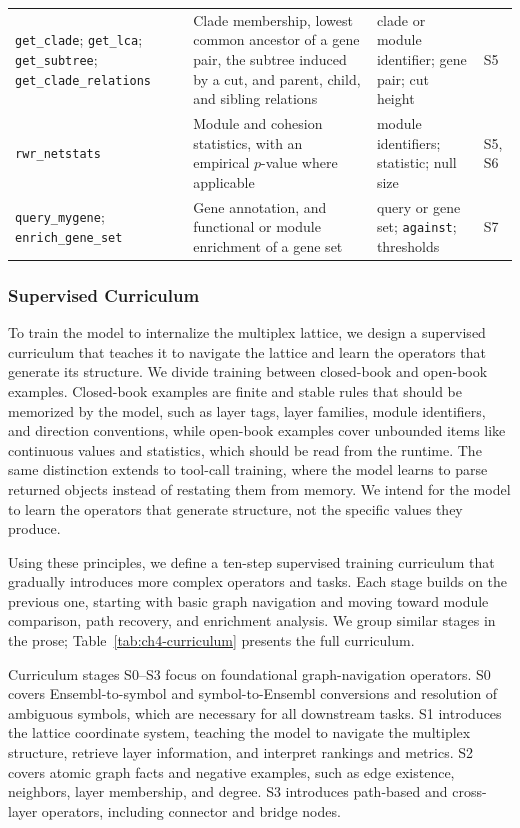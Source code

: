 \documentclass[thesis,letterpaper,12pt]{utthesis}
\begin{document}
\begin{table}[htb!]
\begin{tabularx}{\textwidth}{@{}>{\raggedright\arraybackslash}p{} Y >{\raggedright\arraybackslash}p{0.175\textwidth} >{\centering\arraybackslash}p{0.055\textwidth}@{}}
\addlinespace
\texttt{get\_clade}; \texttt{get\_lca}; \texttt{get\_subtree}; \texttt{get\_clade\_relations}
  & Clade membership, lowest common ancestor of a gene pair, the subtree induced by a cut, and parent, child, and sibling relations
  & clade or module identifier; gene pair; cut height & S5 \\
\addlinespace
\texttt{rwr\_netstats}
  & Module and cohesion statistics, with an empirical $p$-value where applicable
  & module identifiers; statistic; null size & S5, S6 \\
\addlinespace
\texttt{query\_mygene}; \texttt{enrich\_gene\_set}
  & Gene annotation, and functional or module enrichment of a gene set
  & query or gene set; \texttt{against}; thresholds & S7 \\
\bottomrule
\end{tabularx}
\end{table}

\subsubsection{Supervised Curriculum}\label{sec:ch4-curriculum}
To train the model to internalize the multiplex lattice, we design a supervised curriculum that teaches it to navigate the lattice and learn the operators that generate its structure. We divide training between closed-book and open-book examples. Closed-book examples are finite and stable rules that should be memorized by the model, such as layer tags, layer families, module identifiers, and direction conventions, while open-book examples cover unbounded items like continuous values and statistics, which should be read from the runtime. The same distinction extends to tool-call training, where the model learns to parse returned objects instead of restating them from memory. We intend for the model to learn the operators that generate structure, not the specific values they produce.

Using these principles, we define a ten-step supervised training curriculum that gradually introduces more complex operators and tasks. Each stage builds on the previous one, starting with basic graph navigation and moving toward module comparison, path recovery, and enrichment analysis. We group similar stages in the prose; Table~\ref{tab:ch4-curriculum} presents the full curriculum.

Curriculum stages S0--S3 focus on foundational graph-navigation operators. S0 covers Ensembl-to-symbol and symbol-to-Ensembl conversions and resolution of ambiguous symbols, which are necessary for all downstream tasks. S1 introduces the lattice coordinate system, teaching the model to navigate the multiplex structure, retrieve layer information, and interpret rankings and metrics. S2 covers atomic graph facts and negative examples, such as edge existence, neighbors, layer membership, and degree. S3 introduces path-based and cross-layer operators, including connector and bridge nodes.
\end{document}
